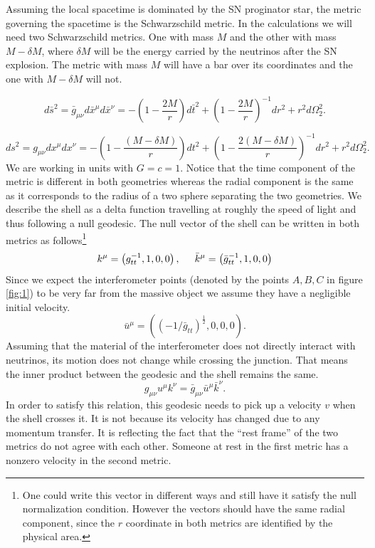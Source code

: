 \documentclass[aps,showpacs,onecolumn,floats,prd,superscriptaddress,nofootinbib]{revtex4-1}
\begin{document}
Assuming the local spacetime is dominated by the SN proginator star, the metric governing the spacetime is the Schwarzschild metric. In the calculations we will need two Schwarzschild metrics. One with mass $M$ and the other with mass $M - \delta M$, where $\delta M$ will be the energy carried by the neutrinos after the SN explosion. The metric with mass $M$ will have a bar over its coordinates and the one with $M- \delta M$ will not. 
 
\begin{equation}
	d\bar{s}^2 = \bar{g}_{\mu \nu} d\bar{x}^\mu d\bar{x}^\nu = - \left( 1 - \frac{2M}{r} \right) d\bar{t}^2 + \left( 1 - \frac{2M}{r} \right)^{-1} d {r}^2 + r^2 d {\Omega}_2^2. \label{SCH}
\end{equation}

\begin{equation}
	ds^2 = g_{\mu \nu} dx^\mu dx^\nu = - \left( 1 - \frac{(M - \delta M)}{r} \right) dt^2 + \left( 1 - \frac{2(M - \delta M)}{r} \right)^{-1} dr^2 + r^2 d \Omega_2^2. \label{SCHa}
\end{equation}
We are working in units with $G = c =1$.  Notice that the time component of the metric is different in both geometries whereas the radial component is the same as it corresponds to the radius of a two sphere separating the two geometries.  We describe the shell as a delta function travelling at roughly the speed of light and thus following a null geodesic. The null vector of the shell can be written in both metrics as follows\footnote{One could write this vector in different ways and still have it satisfy the null normalization condition. However the vectors should have the same radial component, since the $r$ coordinate in both metrics are identified by the physical area.}
\begin{equation}
	k^\mu = \left( g_{tt}^{-1}, 1, 0, 0 \right), \hspace{5mm} \bar{k}^\mu = \left( \bar{g}_{tt}^{-1}, 1, 0, 0 \right)	\label{sigma}
\end{equation}
Since we expect the interferometer points (denoted by the points $A,B,C$ in figure \ref{fig:1}) to be very far from the massive object we assume they have a negligible initial velocity.
\begin{equation}
	\bar{u}^\mu = \left( (-1/\bar{g}_{tt})^\frac{1}{2}, 0, 0, 0 \right).	\label{zeta}
\end{equation}
Assuming that the material of the interferometer does not directly interact with neutrinos, its motion does not change while crossing the junction. 
That means the inner product between the geodesic and the shell remains the same.\begin{equation}
	 g_{\mu \nu} u^\mu k^\nu = \bar{g}_{\mu \nu} \bar{u}^\mu \bar{k}^\nu. 	\label{0IJC}
\end{equation}
In order to satisfy this relation, this geodesic needs to pick up a velocity $v$ when the shell crosses it.
It is not because its velocity has changed due to any momentum transfer.
It is reflecting the fact that the ``rest frame'' of the two metrics do not agree with each other.
Someone at rest in the first metric has a nonzero velocity in the second metric.
\end{document}

